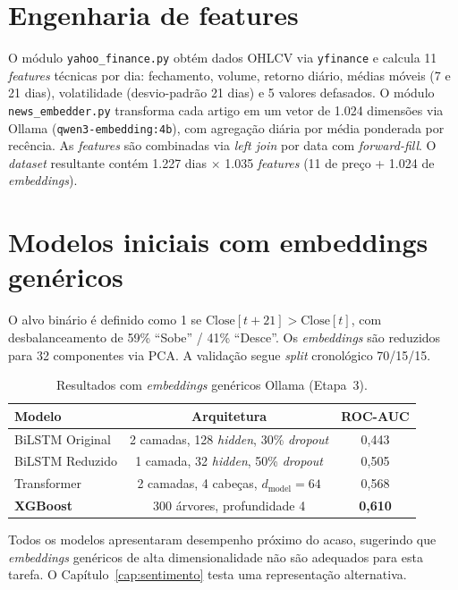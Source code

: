 \documentclass[
    12pt,
    openright,
    oneside,
    a4paper,
    english,
    brazil
]{abntex2}
\begin{document}
\section{Engenharia de features}\label{sec:features}

O módulo \texttt{yahoo\_finance.py} obtém dados OHLCV via \texttt{yfinance} e calcula 11 \textit{features} técnicas por dia: fechamento, volume, retorno diário, médias móveis (7 e 21 dias), volatilidade (desvio-padrão 21 dias) e 5 valores defasados. O módulo \texttt{news\_embedder.py} transforma cada artigo em um vetor de 1.024 dimensões via Ollama (\texttt{qwen3-embedding:4b}), com agregação diária por média ponderada por recência. As \textit{features} são combinadas via \textit{left join} por data com \textit{forward-fill}. O \textit{dataset} resultante contém 1.227 dias $\times$ 1.035 \textit{features} (11 de preço + 1.024 de \textit{embeddings}).

\section{Modelos iniciais com embeddings genéricos}\label{sec:modelos_iniciais}

O alvo binário é definido como 1 se $\text{Close}[t+21] > \text{Close}[t]$, com desbalanceamento de 59\% ``Sobe'' / 41\% ``Desce''. Os \textit{embeddings} são reduzidos para 32 componentes via PCA. A validação segue \textit{split} cronológico 70/15/15.

\begin{table}[htb]
\centering
\caption{Resultados com \textit{embeddings} genéricos Ollama (Etapa~3).}\label{tab:etapa3}
\begin{tabular}{lcc}
\toprule
\textbf{Modelo} & \textbf{Arquitetura} & \textbf{ROC-AUC} \\
\midrule
BiLSTM Original  & 2 camadas, 128 \textit{hidden}, 30\% \textit{dropout} & 0,443 \\
BiLSTM Reduzido  & 1 camada, 32 \textit{hidden}, 50\% \textit{dropout}  & 0,505 \\
Transformer      & 2 camadas, 4 cabeças, $d_\text{model}=64$              & 0,568 \\
\textbf{XGBoost} & 300 árvores, profundidade 4                            & \textbf{0,610} \\
\bottomrule
\end{tabular}
\end{table}

Todos os modelos apresentaram desempenho próximo do acaso, sugerindo que \textit{embeddings} genéricos de alta dimensionalidade não são adequados para esta tarefa. O Capítulo~\ref{cap:sentimento} testa uma representação alternativa.
\end{document}
